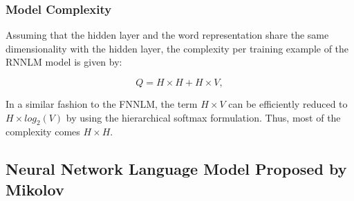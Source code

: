 \subsubsection{Model Complexity}
\label{sec:sub:sub:mikolov_rnnlm_complexity}

Assuming that the hidden layer and the word representation share the same
dimensionality with the hidden layer, the complexity per training example of the \ac{RNNLM} model is
given by:


\begin{equation} Q = H \times H + H \times V,   \end{equation}

In a similar fashion to the \ac{FNNLM}, the term $H \times V$ can be
efficiently reduced to $H \times log_2(V)$ by using the hierarchical softmax
formulation. Thus, most of the complexity comes $H \times H$.







\subsection{Neural Network Language Model Proposed by Mikolov}
\label{sec:mikolov-neural-net-model}



